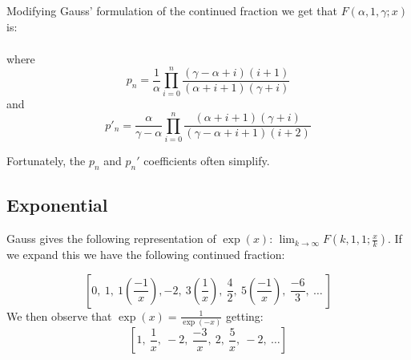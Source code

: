 Modifying Gauss' formulation of the continued fraction we get that
$F(\alpha , 1, \gamma ; x)$ is:

\begin{eqnarray*}
 [0,~1,~\frac{1}{\alpha}(\frac{\gamma}{-x}),
~\frac{\alpha}{\gamma-\alpha}(\gamma+1),~
p_0(\frac{\gamma +2}{-x}),~p'_0(\gamma +3)~\ldots~ &&\\
\qquad p_{n}(\frac{\gamma +2n+2}{-x}),~ p'_{n}(\gamma +2n+3),~ \ldots ]&&
\end{eqnarray*}
where
\[p_n = \frac{1}{\alpha}\prod_{i=0}^n \frac{(\gamma - \alpha +i)(i+1)}%
{(\alpha +i+1)(\gamma +i)}\]
and
\[p'_n = \frac{\alpha}{\gamma-\alpha}
\prod_{i=0}^n \frac{(\alpha +i+1)(\gamma +i)}%
{(\gamma - \alpha +i+1)(i+2)}\]

Fortunately, the $p_n$ and $p_n'$ coefficients often simplify.

\subsection{Exponential}

Gauss gives the following representation of $\exp(x)$:
$\lim_{k\to\infty}F(k,1,1;\frac{x}{k})$. If we expand this we have
the following continued fraction:

\[ [0,~1,~1(\frac{-1}{x}),-2,~3(\frac{1}{x}),~\frac{4}{2},~
5(\frac{-1}{x}),~\frac{-6}{3},~\ldots~]\]
We then observe that $\exp(x) = \frac{1}{\exp(-x)}$ getting:
\[ [1,~\frac{1}{x},~-2,~\frac{-3}{x},~2,~\frac{5}{x},~-2,~\ldots ] \]

